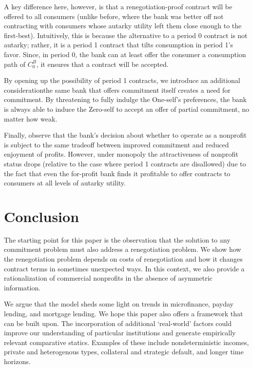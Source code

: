 \documentclass[11pt,english]{article}
\theoremstyle{plain}
\theoremstyle{definition}
\begin{document}
A key difference here, however, is that a renegotiation-proof contract
will be offered to all consumers (unlike before, where the bank was
better off not contracting with consumers whose autarky utility left
them close enough to the first-best). Intuitively, this is because
the alternative to a period 0 contract is not autarky; rather, it
is a period 1 contract that tilts consumption in period 1's favor.
Since, in period 0, the bank can at least offer the consumer a consumption
path of $C_{0}^{B}$, it ensures that a contract will be accepted.

By opening up the possibility of period 1 contracts, we introduce
an additional consideration\textendash the same bank that offers commitment
itself creates a need for commitment. By threatening to fully indulge
the One-self's preferences, the bank is always able to induce the
Zero-self to accept an offer of partial commitment, no matter how
weak.

Finally, observe that the bank's decision about whether to operate
as a nonprofit is subject to the same tradeoff between improved commitment
and reduced enjoyment of profits. However, under monopoly the attractiveness
of nonprofit status drops (relative to the case where period 1 contracts
are disallowed) due to the fact that even the for-profit bank finds
it profitable to offer contracts to consumers at all levels of autarky
utility.

\section{Conclusion}

The starting point for this paper is the observation that the solution
to any commitment problem must also address a renegotiation problem.
We show how the renegotiation problem depends on costs of renegotiation
and how it changes contract terms in sometimes unexpected ways. In
this context, we also provide a rationalization of commercial nonprofits
in the absence of asymmetric information.

We argue that the model sheds some light on trends in microfinance,
payday lending, and mortgage lending. We hope this paper also offers
a framework that can be built upon. The incorporation of additional
`real-world' factors could improve our understanding of particular
institutions and generate empirically relevant comparative statics.
Examples of these include nondeterministic incomes, private and heterogenous
types, collateral and strategic default, and longer time horizons.
\end{document}
